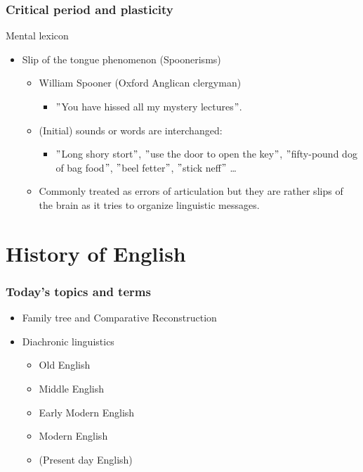 \documentclass[12pt, table]{beamer}
\begin{document}
\begin{frame}
\frametitle{Critical period and plasticity}
Mental lexicon
\begin{itemize}
\item Slip of the tongue phenomenon (Spoonerisms)
\begin{itemize}
\item William Spooner (Oxford Anglican clergyman)
\begin{itemize}
\item $"$You have hissed all my mystery lectures$"$.
\end{itemize}
\item (Initial) sounds or words are interchanged: 
\begin{itemize}
\item $"$Long shory stort$"$, $"$use the door to open the key$"$, $"$fifty-pound dog of bag food$"$, $"$beel fetter$"$, $"$stick neff$"$ \dots
\end{itemize} 
\item Commonly treated as errors of articulation but they are rather slips of the brain as it tries to organize linguistic messages.
\end{itemize}
\end{itemize}
\end{frame}


\section{History of English}
\begin{frame}
\frametitle{Today's topics and terms}
\begin{itemize}
\item Family tree and Comparative Reconstruction
\item Diachronic linguistics
\begin{itemize}
\item Old English
\item Middle English
\item Early Modern English
\item Modern English
\item (Present day English)
\end{itemize}
\end{itemize}
\end{frame}
\end{document}
